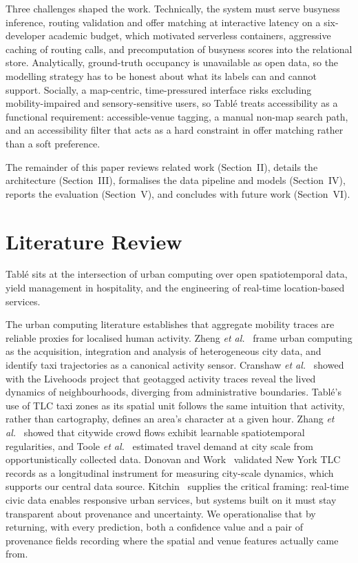 \documentclass[conference]{IEEEtran}
\begin{document}
Three challenges shaped the work. Technically, the system must serve busyness inference, routing validation and offer matching at interactive latency on a six-developer academic budget, which motivated serverless containers, aggressive caching of routing calls, and precomputation of busyness scores into the relational store. Analytically, ground-truth occupancy is unavailable as open data, so the modelling strategy has to be honest about what its labels can and cannot support. Socially, a map-centric, time-pressured interface risks excluding mobility-impaired and sensory-sensitive users, so Tabl\'{e} treats accessibility as a functional requirement: accessible-venue tagging, a manual non-map search path, and an accessibility filter that acts as a hard constraint in offer matching rather than a soft preference.

The remainder of this paper reviews related work (Section~II), details the architecture (Section~III), formalises the data pipeline and models (Section~IV), reports the evaluation (Section~V), and concludes with future work (Section~VI).

\section{Literature Review}

Tabl\'{e} sits at the intersection of urban computing over open spatiotemporal data, yield management in hospitality, and the engineering of real-time location-based services.

The urban computing literature establishes that aggregate mobility traces are reliable proxies for localised human activity. Zheng \textit{et al.}~\cite{b2} frame urban computing as the acquisition, integration and analysis of heterogeneous city data, and identify taxi trajectories as a canonical activity sensor. Cranshaw \textit{et al.}~\cite{b4} showed with the Livehoods project that geotagged activity traces reveal the lived dynamics of neighbourhoods, diverging from administrative boundaries. Tabl\'{e}'s use of TLC taxi zones as its spatial unit follows the same intuition that activity, rather than cartography, defines an area's character at a given hour. Zhang \textit{et al.}~\cite{b3} showed that citywide crowd flows exhibit learnable spatiotemporal regularities, and Toole \textit{et al.}~\cite{b10} estimated travel demand at city scale from opportunistically collected data. Donovan and Work~\cite{b6} validated New York TLC records as a longitudinal instrument for measuring city-scale dynamics, which supports our central data source. Kitchin~\cite{b9} supplies the critical framing: real-time civic data enables responsive urban services, but systems built on it must stay transparent about provenance and uncertainty. We operationalise that by returning, with every prediction, both a confidence value and a pair of provenance fields recording where the spatial and venue features actually came from.
\end{document}

